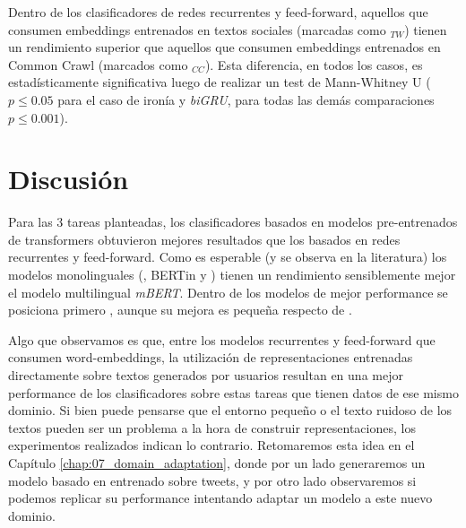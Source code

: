 Dentro de los clasificadores de redes recurrentes y feed-forward, aquellos que consumen embeddings entrenados en textos sociales (marcadas como $_{TW}$) tienen un rendimiento superior que aquellos que consumen embeddings entrenados en Common Crawl (marcados como $_{CC}$). Esta diferencia, en todos los casos, es estadísticamente significativa luego de realizar un test de Mann-Whitney U ($p \leq 0.05$ para el caso de ironía y \emph{biGRU}, para todas las demás comparaciones $p \leq 0.001$).



\section{Discusión}

Para las 3 tareas planteadas, los clasificadores basados en modelos pre-entrenados de transformers obtuvieron mejores resultados que los basados en redes recurrentes y feed-forward. Como es esperable (y se observa en la literatura) los modelos monolinguales (\roberta{}, BERTin y \beto{}) tienen un rendimiento sensiblemente mejor el modelo multilingual \emph{mBERT}. Dentro de los modelos de mejor performance se posiciona primero \roberta{}, aunque su mejora es pequeña respecto de \beto{}.

Algo que observamos es que, entre los modelos recurrentes y feed-forward que consumen word-embeddings, la utilización de representaciones entrenadas directamente sobre textos generados por usuarios resultan en una mejor performance de los clasificadores sobre estas tareas que tienen datos de ese mismo dominio. Si bien puede pensarse que el entorno pequeño o el texto ruidoso de los textos pueden ser un problema a la hora de construir representaciones, los experimentos realizados indican lo contrario. Retomaremos esta idea en el Capítulo \ref{chap:07_domain_adaptation}, donde por un lado generaremos un modelo basado en \roberta{} entrenado sobre tweets, y por otro lado observaremos si podemos replicar su performance intentando adaptar un modelo \beto{} a este nuevo dominio.


\newcommand{\pysentimiento}[0]{\textbf{pysentimiento}}
